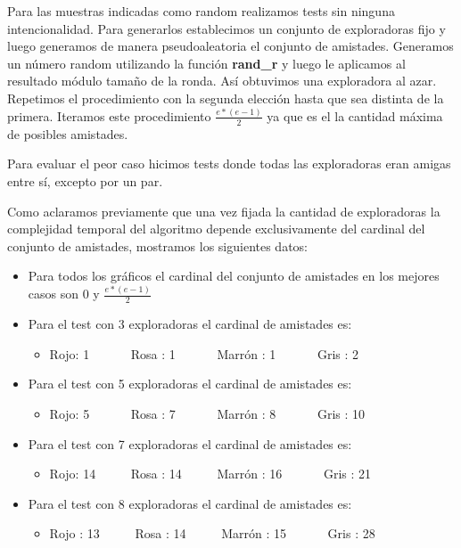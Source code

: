 \documentclass[spanish,a4paper]{article}
\begin{document}
Para las muestras indicadas como random realizamos tests sin ninguna intencionalidad. Para generarlos establecimos un conjunto de 
exploradoras fijo y luego generamos de manera pseudoaleatoria el conjunto de amistades. Generamos un número random 
utilizando la función \textbf{rand\_r} y luego le aplicamos al resultado módulo tamaño de la ronda. Así obtuvimos una exploradora al azar. 
Repetimos el procedimiento con la segunda elección hasta que sea distinta de la primera. Iteramos este procedimiento $\frac{e*(e-1)}{2}$
ya que es el la cantidad máxima de posibles amistades.

Para evaluar el peor caso hicimos tests donde todas las exploradoras eran amigas entre sí, excepto por un par. 

Como aclaramos previamente que una vez fijada la cantidad de exploradoras la complejidad temporal del algoritmo 
depende exclusivamente del cardinal del conjunto de amistades, mostramos los siguientes datos:
\begin{itemize}
  \item Para todos los gráficos el cardinal del conjunto de amistades en los mejores casos son 0 y $\frac{e*(e-1)}{2}$
  \item Para el test con 3 exploradoras el cardinal de amistades es:
    \begin{itemize}
      \item Rojo: 1  \ \ \ \ \ \ \inlineitem Rosa : 1 \ \ \ \ \ \  \inlineitem Marrón : 1  \ \ \ \ \ \ \inlineitem Gris  : 2
    \end{itemize}
  \item Para el test con 5 exploradoras el cardinal de amistades es:
    \begin{itemize}
      \item Rojo: 5  \ \ \ \ \ \ \inlineitem Rosa : 7 \ \ \ \ \ \  \inlineitem Marrón : 8  \ \ \ \ \ \ \inlineitem Gris  : 10
    \end{itemize}
  \item Para el test con 7 exploradoras el cardinal de amistades es:
    \begin{itemize}
      \item Rojo: 14  \ \ \ \ \ \inlineitem Rosa : 14  \ \ \ \ \  \inlineitem Marrón : 16  \ \ \ \ \ \ \inlineitem Gris  : 21
    \end{itemize}
  \item Para el test con 8 exploradoras el cardinal de amistades es:
    \begin{itemize}
      \item Rojo : 13 \ \ \ \ \ \inlineitem Rosa : 14  \ \ \ \ \  \inlineitem Marrón : 15  \ \ \ \ \ \ \inlineitem Gris  : 28
    \end{itemize}
\end{itemize}
\end{document}

